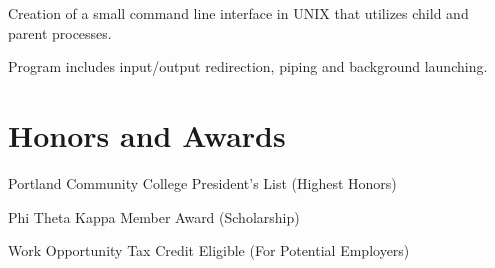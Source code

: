 \documentclass[letterpaper]{deedy-resume} %
\newcommand{\CS}{C\#}
\begin{document}
\begin{minipage}[t]{0.66\textwidth}
\sectionspace %



\vspace{\topsep} %
\begin{tightitemize}
\item Creation of a small command line interface in UNIX that utilizes child and parent processes.
\item Program includes input/output redirection, piping and background launching.
\end{tightitemize}

\sectionspace %






\section{Honors and Awards}
\vspace{\topsep} %
\begin{tightitemize}
\item Portland Community College President's List (Highest Honors)\\
\item Phi Theta Kappa Member Award (Scholarship)\\
\item Work Opportunity Tax Credit Eligible (For Potential Employers)\\
\end{tightitemize}


\end{minipage}
\end{document}
